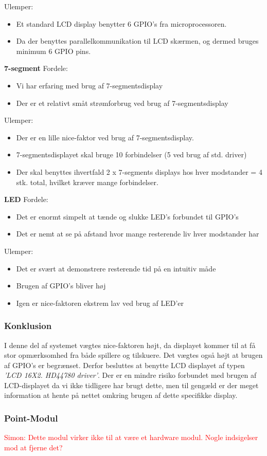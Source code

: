 Ulemper: 
\begin{itemize}
\item Et standard LCD display benytter 6 GPIO's fra microprocessoren. 
\item Da der benyttes parallelkommunikation til LCD skærmen, og dermed bruges minimum 6 GPIO pins.
\end{itemize}

\textbf{7-segment}
Fordele: 
\begin{itemize}
\item Vi har erfaring med brug af 7-segmentsdisplay
\item Der er et relativt småt strømforbrug ved brug af 7-segmentsdisplay 
\end{itemize}

Ulemper: 
\begin{itemize}
\item Der er en lille nice-faktor ved brug af 7-segmentsdisplay. 
\item 7-segmentsdisplayet skal bruge 10 forbindelser (5 ved brug af std. driver)
\item Der skal benyttes ihvertfald 2 x 7-segments displays hos hver modstander = 4 stk. total, hvilket kræver mange forbindelser. 
\end{itemize}

\textbf{LED} \newline
Fordele: 
\begin{itemize}
\item Det er enormt simpelt at tænde og slukke LED's forbundet til GPIO's
\item Det er nemt at se på afstand hvor mange resterende liv hver modstander har
\end{itemize}

Ulemper: 
\begin{itemize}
\item Det er svært at demonstrere resterende tid på en intuitiv måde
\item Brugen af GPIO's bliver høj
\item Igen er nice-faktoren ekstrem lav ved brug af LED'er
\end{itemize}

\subsubsection{Konklusion}
I denne del af systemet vægtes nice-faktoren højt, da displayet kommer til at få stor opmærksomhed fra både spillere og tilskuere. Det vægtes også højt at brugen af GPIO's er begrænset. Derfor besluttes at benytte LCD displayet af typen \textit{'LCD 16X2. HD44780 driver'}. Der er en mindre risiko forbundet med brugen af LCD-displayet da vi ikke tidligere har brugt dette, men til gengæld er der meget information at hente på nettet omkring brugen af dette specifikke display. 

\subsubsection{Point-Modul}
\textcolor{red}{Simon: Dette modul virker ikke til at være et hardware modul. Nogle indsigelser mod at fjerne det?} 